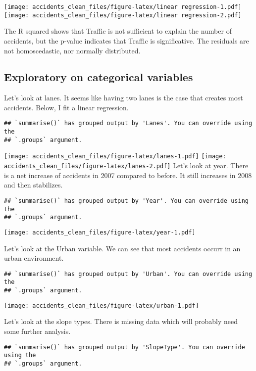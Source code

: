 \documentclass[
]{article}
\begin{document}
\texttt{[image: accidents\_clean\_files/figure-latex/linear regression-1.pdf]}
\texttt{[image: accidents\_clean\_files/figure-latex/linear regression-2.pdf]}

The R squared shows that Traffic is not sufficient to explain the number
of accidents, but the p-value indicates that Traffic is significative.
The residuals are not homoscedastic, nor normally distributed.

\hypertarget{exploratory-on-categorical-variables}{%
\subsection{Exploratory on categorical
variables}\label{exploratory-on-categorical-variables}}

Let's look at lanes. It seems like having two lanes is the case that
creates most accidents. Below, I fit a linear regression.

\begin{verbatim}
## `summarise()` has grouped output by 'Lanes'. You can override using the
## `.groups` argument.
\end{verbatim}

\texttt{[image: accidents\_clean\_files/figure-latex/lanes-1.pdf]}
\texttt{[image: accidents\_clean\_files/figure-latex/lanes-2.pdf]} Let's
look at year. There is a net increase of accidents in 2007 compared to
before. It still increases in 2008 and then stabilizes.

\begin{verbatim}
## `summarise()` has grouped output by 'Year'. You can override using the
## `.groups` argument.
\end{verbatim}

\texttt{[image: accidents\_clean\_files/figure-latex/year-1.pdf]}

Let's look at the Urban variable. We can see that most accidents occurr
in an urban environment.

\begin{verbatim}
## `summarise()` has grouped output by 'Urban'. You can override using the
## `.groups` argument.
\end{verbatim}

\texttt{[image: accidents\_clean\_files/figure-latex/urban-1.pdf]}

Let's look at the slope types. There is missing data which will probably
need some further analysis.

\begin{verbatim}
## `summarise()` has grouped output by 'SlopeType'. You can override using the
## `.groups` argument.
\end{verbatim}
\end{document}
